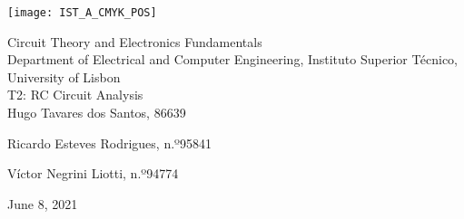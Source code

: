 
\thispagestyle {empty}

\texttt{[image: IST\_A\_CMYK\_POS]}

\begin{center}
%
\vspace{1.0cm}

\vspace{1cm}
{\FontLb Circuit Theory and Electronics Fundamentals} \\ %
\vspace{1cm}
{\FontSn Department of Electrical and Computer Engineering, Instituto Superior Técnico, University of Lisbon} \\ %
\vspace{1cm}
{\FontSn T2: RC Circuit Analysis} \\
\vspace{1cm}
{\FontSn Hugo Tavares dos Santos, 86639}
\par{\FontSn Ricardo Esteves Rodrigues, n.º95841}
\par{\FontSn Víctor Negrini Liotti, n.º94774}
\vspace{1.0cm}




{\FontSn June 8, 2021} \\ %
%
\end{center}

